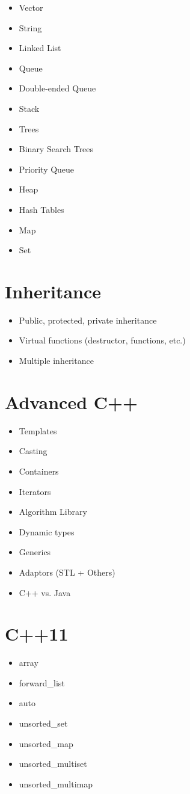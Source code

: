 \documentclass{article}
\begin{document}
\begin{multicols}{2}
\begin{itemize}
	\item{Vector}
	\item{String}
	\item{Linked List}
	\item{Queue}
	\item{Double-ended Queue}
	\item{Stack}
	\item{Trees}
	\item{Binary Search Trees}
	\item{Priority Queue}
	\item{Heap}
	\item{Hash Tables}
	\item{Map}
	\item{Set}
\end{itemize}

\section{Inheritance}

\begin{itemize}
	\item{Public, protected, private inheritance}
	\item{Virtual functions (destructor, functions, etc.)}
	\item{Multiple inheritance}
\end{itemize}

\section{Advanced C++}

\begin{itemize}
	\item{Templates}
	\item{Casting}
	\item{Containers}
	\item{Iterators}
	\item{Algorithm Library}
	\item{Dynamic types}
	\item{Generics}
	\item{Adaptors (STL + Others)}
	\item{C++ vs. Java}
\end{itemize}

\section{C++11}

\begin{itemize}
	\item{array}
	\item{forward\_list}
	\item{auto}
	\item{unsorted\_set}
	\item{unsorted\_map}
	\item{unsorted\_multiset}
	\item{unsorted\_multimap}
\end{itemize}
	
\end{multicols}
\end{document}
